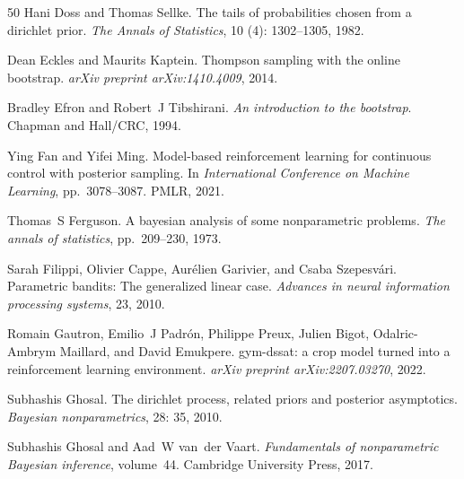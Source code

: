 \documentclass[10pt]{article}
\begin{document}
\begin{thebibliography}{50}
Hani Doss and Thomas Sellke.
\newblock The tails of probabilities chosen from a dirichlet prior.
\newblock \emph{The Annals of Statistics}, 10 (4): 1302--1305, 1982.

Dean Eckles and Maurits Kaptein.
\newblock Thompson sampling with the online bootstrap.
\newblock \emph{arXiv preprint arXiv:1410.4009}, 2014.

Bradley Efron and Robert~J Tibshirani.
\newblock \emph{An introduction to the bootstrap}.
\newblock Chapman and Hall/CRC, 1994.

Ying Fan and Yifei Ming.
\newblock Model-based reinforcement learning for continuous control with posterior sampling.
\newblock In \emph{International Conference on Machine Learning}, pp.\  3078--3087. PMLR, 2021.

Thomas~S Ferguson.
\newblock A bayesian analysis of some nonparametric problems.
\newblock \emph{The annals of statistics}, pp.\  209--230, 1973.

Sarah Filippi, Olivier Cappe, Aur{\'e}lien Garivier, and Csaba Szepesv{\'a}ri.
\newblock Parametric bandits: The generalized linear case.
\newblock \emph{Advances in neural information processing systems}, 23, 2010.

Romain Gautron, Emilio~J Padr{\'o}n, Philippe Preux, Julien Bigot, Odalric-Ambrym Maillard, and David Emukpere.
\newblock gym-dssat: a crop model turned into a reinforcement learning environment.
\newblock \emph{arXiv preprint arXiv:2207.03270}, 2022.

Subhashis Ghosal.
\newblock The dirichlet process, related priors and posterior asymptotics.
\newblock \emph{Bayesian nonparametrics}, 28: 35, 2010.

Subhashis Ghosal and Aad~W van~der Vaart.
\newblock \emph{Fundamentals of nonparametric Bayesian inference}, volume~44.
\newblock Cambridge University Press, 2017.


\end{thebibliography}
\end{document}
